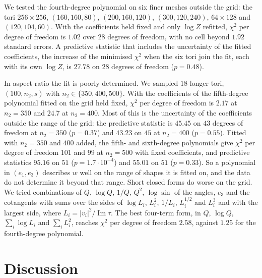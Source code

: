 \documentclass[11pt]{amsart}
\theoremstyle{definition}
\theoremstyle{remark}
\begin{document}
We tested the fourth-degree polynomial on six finer meshes outside the grid: the tori $256\times256$, $(160,160,80)$,
$(200,160,120)$, $(300,120,240)$, $64\times128$ and $(120,104,60)$. With the coefficients held fixed and only $\log Z$
refitted, $\chi^2$ per degree of freedom is $1.02$ over $28$ degrees of freedom, with no cell beyond $1.92$ standard
errors. A predictive statistic that includes the uncertainty of the fitted coefficients, the increase of the minimised
$\chi^2$ when the six tori join the fit, each with its own $\log Z$, is $27.78$ on $28$ degrees of freedom
($p=0.48$).

In aspect ratio the fit is poorly determined. We sampled $18$ longer tori, $(100,n_2,s)$ with $n_2\in\{350,400,500\}$.
With the coefficients of the fifth-degree polynomial fitted on the grid held fixed, $\chi^2$ per degree of freedom is
$2.17$ at $n_2=350$ and $24.7$ at $n_2=400$. Most of this is the uncertainty of the coefficients outside the range of
the grid: the predictive statistic is $45.45$ on $43$ degrees of freedom at $n_2=350$ ($p=0.37$) and $43.23$ on $45$ at
$n_2=400$ ($p=0.55$). Fitted with $n_2=350$ and $400$ added, the fifth- and sixth-degree polynomials give $\chi^2$ per
degree of freedom $101$ and $99$ at $n_2=500$ with fixed coefficients, and predictive statistics $95.16$ on $51$
($p=1.7\cdot10^{-4}$) and $55.01$ on $51$ ($p=0.33$). So a polynomial in $(e_1,e_3)$ describes $w$ well on the range of
shapes it is fitted on, and the data do not determine it beyond that range. Short closed forms do worse on the grid. We
tried combinations of $Q$, $\log Q$, $1/Q$, $Q^2$, $\log\sin$ of the angles, $e_3$ and the cotangents with sums over the
sides of $\log L_i$, $L_i^2$, $1/L_i$, $L_i^{1/2}$ and $L_i^3$ and with the largest side, where
$L_i=|v_i|^2/\operatorname{Im}\tau$. The best four-term form, in $Q$, $\log Q$, $\sum_i\log L_i$ and $\sum_i L_i^2$,
reaches $\chi^2$ per degree of freedom $2.58$, against $1.25$ for the fourth-degree polynomial.

\section{Discussion}
\end{document}
